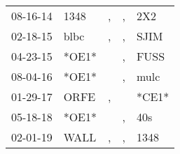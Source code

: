 \begin{supertabular}{lllll}
 08-16-14 &   1348 &                , &             , &    2X2 \\
 02-18-15 &   blbc &                , &             , &   SJIM \\
 04-23-15 &  *OE1* &                  &             , &   FUSS \\
 08-04-16 &  *OE1* &                  &             , &   mulc \\
 01-29-17 &   ORFE &                , &               &  *CE1* \\
 05-18-18 &  *OE1* &                  &             , &    40s \\
 02-01-19 &   WALL &                , &             , &   1348 \\
\end{supertabular}

